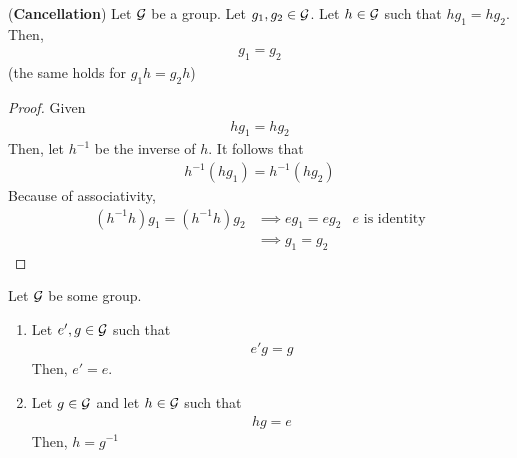 \begin{proposition}
    (\textbf{Cancellation}) Let $\mathcal{G}$ be a group. Let $g_1,g_2 \in \mathcal{G}$. Let $h \in \mathcal{G}$ such that $hg_1 = hg_2$. Then,
    \begin{align}
        g_1 = g_2
    \end{align}
    (the same holds for $g_1h = g_2h$)
\end{proposition}
\begin{proof}
    Given
    \begin{align}
        hg_1 = hg_2
    \end{align}
    Then, let $h^{-1}$ be the inverse of $h$. It follows that
    \begin{align}
        h^{-1} (hg_1) = h^{-1} (hg_2)
    \end{align}
    Because of associativity,
    \begin{align}
        (h^{-1} h)g_1 = (h^{-1} h)g_2 &\implies e g_1 = e g_2 & e \text{ is identity}\\
        &\implies g_1 = g_2
    \end{align}
\end{proof}

\begin{corollary}
    Let $\mathcal{G}$ be some group.
    \begin{enumerate}
        \item Let $e', g \in \mathcal{G}$ such that
        \begin{align}
            e' g = g
        \end{align}
        Then, $e' = e$.
        \item Let $g \in \mathcal{G}$ and let $h \in \mathcal{G}$ such that
        \begin{align}
            hg = e
        \end{align}
        Then, $h = g^{-1}$
    \end{enumerate}
\end{corollary}

